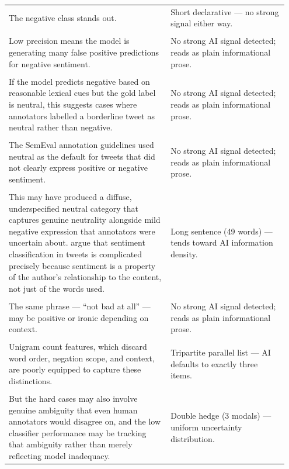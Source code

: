 \documentclass[11pt]{article}
\begin{document}
\begin{longtable}{|p{0.55\linewidth}|p{0.40\linewidth}|}
\hline
\rule{0pt}{3.5cm} & \\
\hline
The negative class stands out. & Short declarative --- no strong signal either way. \\[2pt]
\hline
\rule{0pt}{3.5cm} & \\
\hline
Low precision means the model is generating many false positive predictions for negative sentiment. & No strong AI signal detected; reads as plain informational prose. \\[2pt]
\hline
\rule{0pt}{3.5cm} & \\
\hline
If the model predicts negative based on reasonable lexical cues but the gold label is neutral, this suggests cases where annotators labelled a borderline tweet as neutral rather than negative. & No strong AI signal detected; reads as plain informational prose. \\[2pt]
\hline
\rule{0pt}{3.5cm} & \\
\hline
The SemEval annotation guidelines used neutral as the default for tweets that did not clearly express positive or negative sentiment. & No strong AI signal detected; reads as plain informational prose. \\[2pt]
\hline
\rule{0pt}{3.5cm} & \\
\hline
This may have produced a diffuse, underspecified neutral category that captures genuine neutrality alongside mild negative expression that annotators were uncertain about. argue that sentiment classification in tweets is complicated precisely because sentiment is a property of the author's relationship to the content, not just of the words used. & Long sentence (49 words) --- tends toward AI information density. \\[2pt]
\hline
\rule{0pt}{3.5cm} & \\
\hline
The same phrase --- ``not bad at all'' --- may be positive or ironic depending on context. & No strong AI signal detected; reads as plain informational prose. \\[2pt]
\hline
\rule{0pt}{3.5cm} & \\
\hline
Unigram count features, which discard word order, negation scope, and context, are poorly equipped to capture these distinctions. & Tripartite parallel list --- AI defaults to exactly three items. \\[2pt]
\hline
\rule{0pt}{3.5cm} & \\
\hline
But the hard cases may also involve genuine ambiguity that even human annotators would disagree on, and the low classifier performance may be tracking that ambiguity rather than merely reflecting model inadequacy. & Double hedge (3 modals) --- uniform uncertainty distribution. \\[2pt]

\end{longtable}
\end{document}
